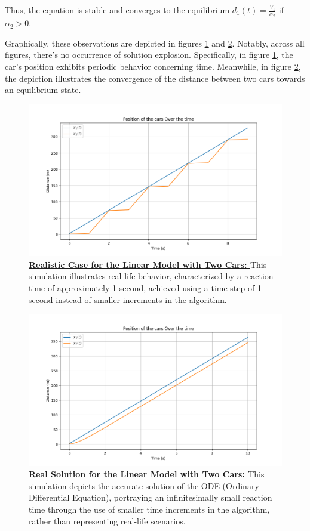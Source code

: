 \documentclass{article}
\begin{document}
		Thus, the equation is stable and converges to the equilibrium \(\boxed{d_1(t)=\frac{V_1}{\alpha_2}}\) if \(\alpha_2 > 0\).
		
		Graphically, these observations are depicted in figures \ref{fig:RC1} and \ref{fig:RS1}. Notably, across all figures, there's no occurrence of solution explosion. Specifically, in figure \ref{fig:RC1}, the car's position exhibits periodic behavior concerning time. Meanwhile, in figure \ref{fig:RS1}, the depiction illustrates the convergence of the distance between two cars towards an equilibrium state.
		
		\begin{figure}[H]
			\centering
			\includegraphics[width=0.8\linewidth]{RealisticCase.png}
			\caption[Realistic Case for the Linear Model with Two Cars]{\textbf{\underline{Realistic Case for the Linear Model with Two Cars: }}This simulation illustrates real-life behavior, characterized by a reaction time of approximately 1 second, achieved using a time step of 1 second instead of smaller increments in the algorithm.}
			\label{fig:RC1}
		\end{figure}
		
		\begin{figure}[H]
			\centering
			\includegraphics[width=0.8\linewidth]{RealSolCase.png}
			\caption[Real Solution for the Linear Model with Two Cars]{\textbf{\underline{Real Solution for the Linear Model with Two Cars: }}This simulation depicts the accurate solution of the ODE (Ordinary Differential Equation), portraying an infinitesimally small reaction time through the use of smaller time increments in the algorithm, rather than representing real-life scenarios.}
			\label{fig:RS1}
		\end{figure}
		
\end{document}
